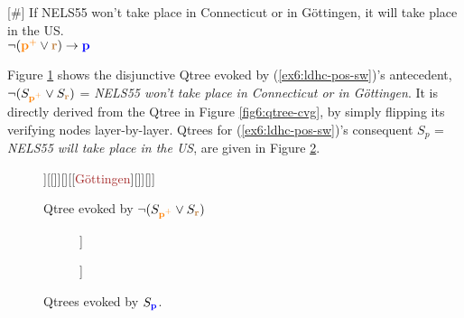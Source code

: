 \begin{exe}
	[\#] {If NELS55 won't take place in Connecticut or in Göttingen, it will take place in the US.
		\\ $\neg(\textbf{\textcolor{orange}{p$^+$}}\vee\textbf{\textcolor{brown}{r}})\rightarrow \textbf{\textcolor{blue}{p}}$}
\end{exe}

Figure \ref{fig6:qtree-n(cvg)} shows the disjunctive Qtree evoked by (\ref{ex6:ldhc-pos-sw})'s antecedent, $\neg (S_{\textbf{\textcolor{orange}{p$^+$}}} \vee S_{\textbf{\textcolor{brown}{r}}})$ = \textit{NELS55 won't take place in Connecticut or in Göttingen}. It is directly derived from the Qtree in Figure \ref{fig6:qtree-cvg}, by simply flipping its verifying nodes layer-by-layer. Qtrees for (\ref{ex6:ldhc-pos-sw})'s consequent $S_p$ = \textit{NELS55 will take place in the US}, are given in Figure \ref{fig6:qtrees-us}. 
\begin{figure}[H]
	\centering
	\begin{forest}
		[CS[{\textcolor{orange}{Connecticut}}[\fbox{\textcolor{brown}{New Haven}}][\fbox{\textcolor{brown}{...}}]][\fbox{\textcolor{orange}{Massachusetts}}[\fbox{\textcolor{brown}{...}}]][\fbox{\textcolor{orange}{...}}][\fbox{\textcolor{orange}{Lower Saxony}}[{\textcolor{brown}{Göttingen}}][\fbox{\textcolor{brown}{...}}]][\fbox{\textcolor{orange}{...}}]]
	\end{forest}
	\caption[]{Qtree evoked by $\neg (S_{\textbf{\textcolor{orange}{p$^+$}}} \vee S_{\textbf{\textcolor{brown}{r}}})$}\label{fig6:qtree-n(cvg)}
\end{figure}
\begin{figure}[H]
	\begin{subfigure}[b]{.45\linewidth}
		\centering
		\begin{forest}
			[CS[\fbox{\textcolor{blue}{US}}][\textcolor{blue}{Germany}][\textcolor{blue}{...}]]
		\end{forest}
	\end{subfigure}
	\begin{subfigure}[b]{.45\linewidth}
		\centering
		\begin{forest}
			[CS[\fbox{\textcolor{blue}{US}}][\textcolor{blue}{$\neg$US}]]
		\end{forest}
		
	\end{subfigure}	
	\caption[]{Qtrees evoked by $S_{\textbf{\textcolor{blue}{p}}}$.}\label{fig6:qtrees-us}
\end{figure}


